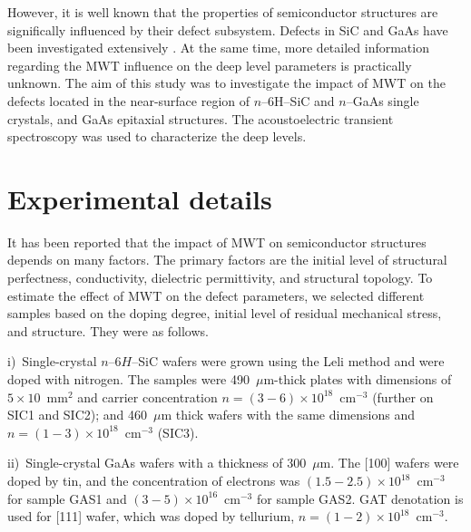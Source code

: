 \documentclass[10pt]{iopart}
\begin{document}
However, it is well known that the properties of semiconductor structures are significally influenced by their defect subsystem.
Defects in SiC and GaAs have been investigated extensively \cite{SiCDavid,SiCWei,GAPel2020,GASobolev2020}.
At the same time,
more detailed information regarding the MWT influence on the deep level parameters is practically unknown.
The aim of this study was to investigate the impact of MWT on the defects located in the near-surface region
of $n$--6H--SiC and $n$--GaAs single crystals,
and  GaAs  epitaxial structures.
The  acoustoelectric  transient spectroscopy was used to characterize the deep levels.

\section{Experimental details}\label{sec:Exp}

It has been reported \cite{BoltovetsEn,Milenin1994En,BelyaevIntac,ASHKINADZE1996,ProcSPIE} that
the impact of MWT on semiconductor structures depends on many factors.
The primary factors are the initial level of structural perfectness, conductivity, dielectric permittivity, and structural topology.
To estimate the effect of MWT on the defect parameters, we selected different samples based on the doping degree, initial level of residual mechanical stress, and structure.
They were as follows.

\noindent
i)~Single-crystal $n$--6$H$--SiC wafers were grown using the Leli method and were doped with nitrogen.
   The samples were  490~$\mu$m-thick plates with dimensions of $5\times10$~mm$^2$ and  carrier concentration $n=(3-6)\times10^{18}$~cm$^{-3}$
    (further on SIC1 and SIC2);
    and 460~$\mu$m thick wafers with the same dimensions and $n=(1-3)\times10^{18}$~cm$^{-3}$ (SIC3).

\noindent
ii)~Single-crystal GaAs  wafers with a thickness of 300~$\mu$m.
   The [100] wafers were  doped by tin, and the concentration of electrons was $(1.5-2.5)\times10^{18}$~cm$^{-3}$
   for sample  GAS1 and $(3-5)\times10^{16}$~cm$^{-3}$ for sample GAS2.
   GAT denotation is used for [111] wafer, which was doped by tellurium,
   $n = (1-2)\times10^{18}$~cm$^{-3}$.
\end{document}
